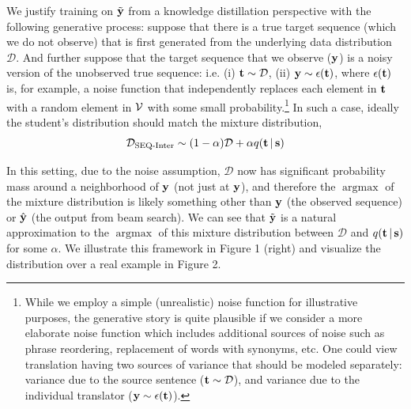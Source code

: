 \documentclass[11pt,letterpaper]{article}
\DeclareMathOperator*{\argmax}{argmax}
\begin{document}
We justify training on $\tilde{\mathbf{y}}$ from a knowledge distillation perspective with the following
generative process: suppose that there is a true target sequence (which we do not observe) that
is first generated from the underlying data distribution  $\mathcal{D}$. And further suppose 
that the target sequence that we observe ($\mathbf{y}$) is a noisy version of the unobserved true sequence: i.e. 
(i) $\mathbf{t} \sim \mathcal{D}$, (ii) $\mathbf{y} \sim \epsilon(\mathbf{t})$, 
where  $\epsilon(\mathbf{t})$ is, for example, a noise function that independently
replaces each element in $\mathbf{t}$ with 
a random element in $\mathcal{V}$ with some small probability.\footnote{While we employ a simple
  (unrealistic) noise function 
for illustrative purposes, the generative story is quite plausible if we consider a more
elaborate noise function which includes additional sources of noise such as phrase reordering,
replacement of words with synonyms, etc. 
One could view translation having two sources of variance that should be modeled separately: 
variance due to the source sentence ($\mathbf{t} \sim \mathcal{D}$), and 
variance due to the individual translator ($\mathbf{y} \sim \epsilon(\mathbf{t})$).}
In such a case, ideally the student's
distribution should match the mixture distribution, 
\begin{equation*}
\mathcal{D}_{\text{SEQ-Inter}} \sim (1-\alpha)\mathcal{D} + \alpha q(\mathbf{t} \,|\, \mathbf{s})
\end{equation*}

In this setting, due to the noise assumption, $\mathcal{D}$ now has significant probability mass around
a neighborhood of $\mathbf{y}$ (not just at $\mathbf{y}$), and therefore the
$\argmax$ of the  mixture distribution is likely something other
than $\mathbf{y}$ (the observed sequence) or $\hat{\mathbf{y}}$ (the output from beam search). 
We can see that 
$\tilde{\mathbf{y}}$ is a natural approximation to the $\argmax$ of this
mixture distribution between $\mathcal{D}$ and $q(\mathbf{t} \,|\, \mathbf{s})$
for some $\alpha$. We illustrate this framework in Figure 1 (right) and visualize the distribution
over a real example in Figure 2.
\end{document}
